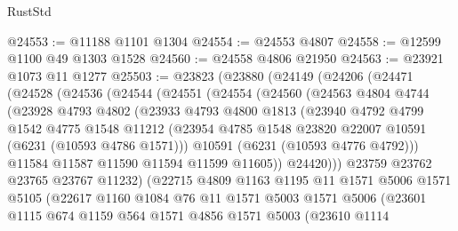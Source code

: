\begin{lexlean}{RustStd}
\begin{coremodule}
{{@24553 := @11188 @1101 @1304
@24554 := @24553 @4807
@24558 := @12599 @1100 @49 @1303 @1528
@24560 := @24558 @4806 @21950
@24563 := @23921 @1073 @11 @1277
@25503 := @23823
    (@23880
      (@24149
        (@24206
          (@24471
            (@24528
              (@24536
                (@24544
                  (@24551
                    (@24554
                      (@24560
                        (@24563
                          @4804
                          @4744
                          (@23928
                            @4793
                            @4802
                            (@23933
                              @4793
                              @4800
                              @1813
                              (@23940
                                @4792
                                @4799
                                @1542
                                @4775
                                @1548
                                @11212
                                (@23954
                                  @4785
                                  @1548
                                  @23820
                                  @22007
                                  @10591
                                  (@6231 (@10593 @4786 @1571)))
                                @10591
                                (@6231 (@10593 @4776 @4792)))
                              @11584
                              @11587
                              @11590
                              @11594
                              @11599
                              @11605))
                          @24420)))
                    @23759
                    @23762
                    @23765
                    @23767
                    @11232)
                  (@22715
                    @4809
                    @1163
                    @1195
                    @11
                    @1571
                    @5006
                    @1571
                    @5105
                    (@22617
                      @1160
                      @1084
                      @76
                      @11
                      @1571
                      @5003
                      @1571
                      @5006
                      (@23601
                        @1115
                        @674
                        @1159
                        @564
                        @1571
                        @4856
                        @1571
                        @5003
                        (@23610
                          @1114
}}
\end{coremodule}
\end{lexlean}
